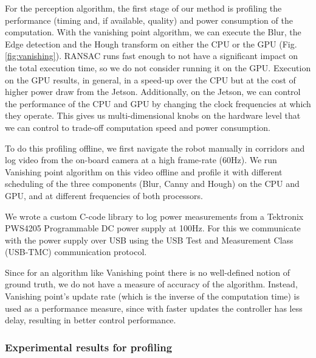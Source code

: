 For the perception algorithm, the first stage of our method is profiling the performance (timing and, if available, quality) and power consumption of the computation. With the vanishing point algorithm, we can execute the Blur, the Edge detection and the Hough transform on either the CPU or the GPU (Fig. \ref{fig:vanishing}). RANSAC runs fast enough to not have a significant impact on the total execution time, so we do not consider running it on the GPU. Execution on the GPU results, in general, in a speed-up over the CPU but at the cost of higher power draw from the Jetson. Additionally, on the Jetson, we can control the performance of the CPU and GPU by changing the clock frequencies at which they operate. This gives us multi-dimensional knobs on the hardware level that we can control to trade-off computation speed and power consumption.

To do this profiling offline, we first navigate the robot manually in corridors and log video from the on-board camera at a high frame-rate (60Hz). 
We run Vanishing point algorithm on this video offline and profile it with different scheduling of the three components (Blur, Canny and Hough) on the CPU and GPU, and at different frequencies of both processors.

We wrote a custom C-code library to log power measurements from a Tektronix PWS4205 Programmable DC power supply at 100Hz. 
For this we communicate with the power supply over USB using the USB Test and Measurement Class (USB-TMC) communication protocol. 
 
Since for an algorithm like Vanishing point there is no well-defined notion of ground truth, we do not have a measure of accuracy of the algorithm. 
Instead, Vanishing point's update rate (which is the inverse of the computation time) is used as a performance measure, since with faster updates the controller has less delay, resulting in better control performance. 

\subsubsection{Experimental results for profiling}

